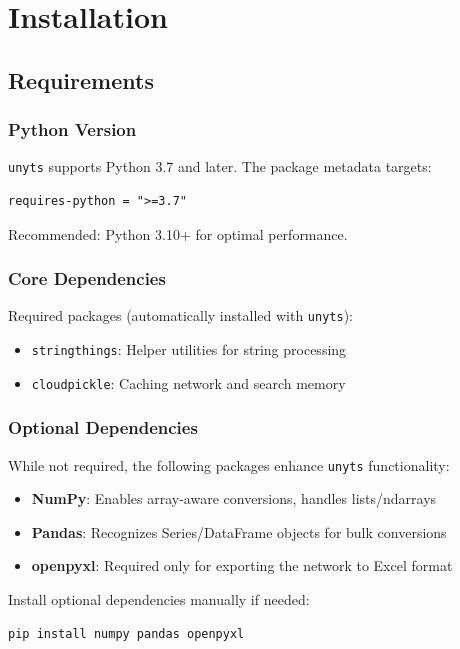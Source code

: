 \documentclass[11pt,a4paper]{report}
\begin{document}
\chapter{Installation}

\section{Requirements}

\subsection{Python Version}
\texttt{unyts} supports Python 3.7 and later. The package metadata targets:
\begin{lstlisting}[style=bashstyle]
requires-python = ">=3.7"
\end{lstlisting}

Recommended: Python 3.10+ for optimal performance.

\subsection{Core Dependencies}

Required packages (automatically installed with \texttt{unyts}):
\begin{itemize}[leftmargin=*]
  \item \texttt{stringthings}: Helper utilities for string processing
  \item \texttt{cloudpickle}: Caching network and search memory
\end{itemize}

\subsection{Optional Dependencies}

While not required, the following packages enhance \texttt{unyts} functionality:
\begin{itemize}[leftmargin=*]
  \item \textbf{NumPy}: Enables array-aware conversions, handles lists/ndarrays
  \item \textbf{Pandas}: Recognizes Series/DataFrame objects for bulk conversions
  \item \textbf{openpyxl}: Required only for exporting the network to Excel format
\end{itemize}

Install optional dependencies manually if needed:
\begin{lstlisting}[style=bashstyle]
pip install numpy pandas openpyxl
\end{lstlisting}
\end{document}
